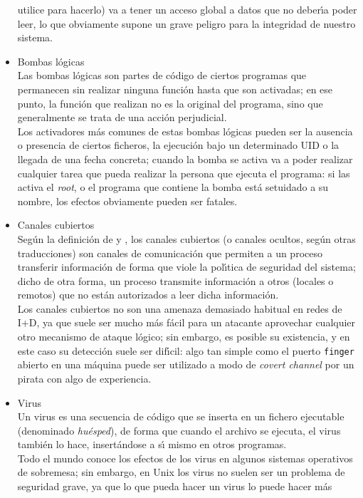 \begin{itemize}
utilice para hacerlo) va a tener un acceso global a datos que no deber\'{\i}a
poder leer, lo que obviamente supone un grave peligro para la integridad de 
nuestro sistema.
\item Bombas l\'ogicas\\
Las bombas l\'ogicas son partes de c\'odigo de ciertos programas que permanecen 
sin realizar ninguna funci\'on hasta que son activadas; en ese punto, la 
funci\'on que realizan no es la original del programa, sino que generalmente 
se trata de una acci\'on perjudicial.\\
Los activadores m\'as comunes de estas bombas l\'ogicas pueden ser la ausencia
o presencia de ciertos ficheros, la ejecuci\'on bajo un determinado UID o la
llegada de una fecha concreta; cuando la bomba se activa va a poder realizar
cualquier tarea que pueda realizar la persona que ejecuta el programa: si las
activa el {\it root}, o el programa que contiene la bomba est\'a setuidado a su 
nombre, los efectos obviamente pueden ser fatales.
\item Canales cubiertos\\
Seg\'un la definici\'on de \cite{kn:ora} y \cite{kn:glo}, los canales cubiertos 
(o canales ocultos, seg\'un otras traducciones) son canales de 
comunicaci\'on que permiten a un proceso transferir informaci\'on de forma que 
viole la pol\'{\i}tica de seguridad del sistema; dicho de otra forma, un proceso
transmite informaci\'on a otros (locales o remotos) que no est\'an autorizados
a leer dicha informaci\'on.\\
Los canales cubiertos no son una amenaza demasiado habitual en redes de I+D, ya
que suele ser mucho m\'as f\'acil para un atacante aprovechar cualquier otro
mecanismo de ataque l\'ogico; sin embargo, es posible su existencia, y en este
caso su detecci\'on suele ser dif\'{\i}cil: algo tan simple
como el puerto {\tt finger} abierto en una m\'aquina puede ser utilizado a modo
de {\it covert channel} por un pirata con algo de experiencia.
\item Virus\\
Un virus es una secuencia de c\'odigo que se inserta en un fichero ejecutable
(denominado {\it hu\'esped}), de forma que cuando el archivo se ejecuta, el 
virus tambi\'en lo hace, insert\'andose a s\'{\i} mismo en otros programas.\\
Todo el mundo conoce los efectos de los virus en algunos sistemas operativos de
sobremesa; sin embargo, en Unix los virus no suelen ser un problema de 
seguridad grave, ya que lo que pueda hacer un virus lo puede hacer m\'as 

\end{itemize}
